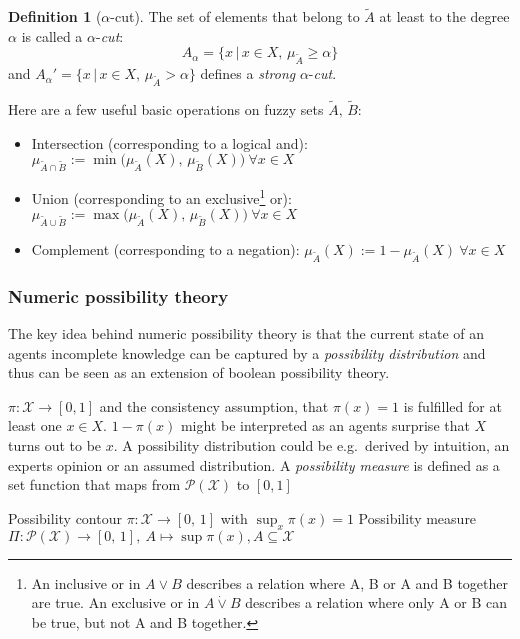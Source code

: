 \documentclass[
]{report}
\theoremstyle{definition}
\theoremstyle{definition}
\newtheorem{definition}{Definition}[section]
\begin{document}
\begin{definition}[$\alpha$-cut]
The set of elements that belong to $\tilde{A}$ at least to the degree $\alpha$ is called a $\alpha$-\textit{cut}:
$$A_{\alpha} = \big\{ x \, | \, x \in X, \, \mu_{\tilde{A}} \geq \alpha \big\}$$
and $A_{\alpha}' = \big\{ x \, | \, x \in X, \, \mu_{\tilde{A}} > \alpha \big\}$ defines a \textit{strong} $\alpha$-\textit{cut}. 
\end{definition}

Here are a few useful basic operations on fuzzy sets
\(\tilde{A}, \, \tilde{B}\):

\begin{itemize}
  \item Intersection (corresponding to a logical and): $\mu_{\tilde{A} \cap \tilde{B}} := \min \big( \mu_{\tilde{A}} (X), \, \mu_{\tilde{B}} (X) \big) \ \forall x \in X$
  \item Union (corresponding to an exclusive\footnote{An inclusive or in $A \lor B$ describes a relation where A, B or A and B together are true. An exclusive or in $A \dot\lor B$ describes a relation where only A or B can be true, but not A and B together.} or): $\mu_{\tilde{A} \cup \tilde{B}} := \max \big( \mu_{\tilde{A}} (X), \, \mu_{\tilde{B}} (X) \big) \ \forall x \in X$ 
  \item Complement (corresponding to a negation): $\mu_{\tilde{A}} (X) := 1 - \mu_{\tilde{A}} (X) \ \forall x \in X$
\end{itemize}

\subsubsection{Numeric possibility theory}

The key idea behind numeric possibility theory is that the current state
of an agents incomplete knowledge can be captured by a
\textit{possibility distribution} and thus can be seen as an extension
of boolean possibility theory.

\(\pi: \mathcal{X} \rightarrow [0, 1]\) and the consistency assumption,
that \(\pi (x) = 1\) is fulfilled for at least one \(x \in X\).
\(1 - \pi (x)\) might be interpreted as an agents surprise that \(X\)
turns out to be \(x\). A possibility distribution could be e.g.~derived
by intuition, an experts opinion or an assumed distribution. A
\textit{possibility measure} is defined as a set function that maps from
\(\mathcal{P} (\mathcal{X})\) to \([0,1]\)

Possibility contour \(\pi: \mathcal{X} \rightarrow [0, \, 1]\) with
\(\sup_x \pi (x) = 1\) Possibility measure
\(\Pi: \mathcal{P}(\mathcal{X}) \rightarrow [0, \, 1], \ A \mapsto \sup \pi (x), A \subseteq \mathcal{X}\)
\end{document}
